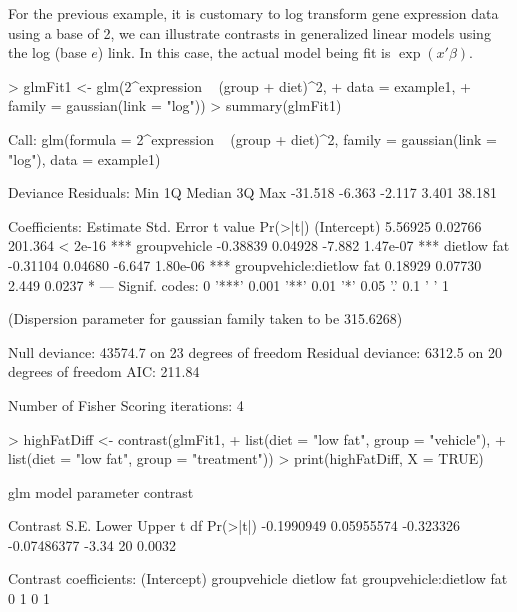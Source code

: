 \documentclass[12pt]{article}
\renewenvironment{Schunk}{\vspace{\topsep}}{\vspace{\topsep}}
\begin{document}
For the previous example, it is customary to log transform gene expression data using a base of 2, we can illustrate contrasts in generalized linear models using the log (base $e$) link. In this case, the actual model being fit is $\exp(x'\beta)$.  
\begin{Schunk}
\begin{Sinput}
> glmFit1 <- glm(2^expression ~ (group + diet)^2, 
+                data = example1, 
+                family = gaussian(link = "log"))
> summary(glmFit1)
\end{Sinput}
\begin{Soutput}
Call:
glm(formula = 2^expression ~ (group + diet)^2, family = gaussian(link = "log"), 
    data = example1)

Deviance Residuals: 
    Min       1Q   Median       3Q      Max  
-31.518   -6.363   -2.117    3.401   38.181  

Coefficients:
                         Estimate Std. Error t value Pr(>|t|)    
(Intercept)               5.56925    0.02766 201.364  < 2e-16 ***
groupvehicle             -0.38839    0.04928  -7.882 1.47e-07 ***
dietlow fat              -0.31104    0.04680  -6.647 1.80e-06 ***
groupvehicle:dietlow fat  0.18929    0.07730   2.449   0.0237 *  
---
Signif. codes:  0 '***' 0.001 '**' 0.01 '*' 0.05 '.' 0.1 ' ' 1 

(Dispersion parameter for gaussian family taken to be 315.6268)

    Null deviance: 43574.7  on 23  degrees of freedom
Residual deviance:  6312.5  on 20  degrees of freedom
AIC: 211.84

Number of Fisher Scoring iterations: 4
\end{Soutput}
\begin{Sinput}
> highFatDiff <- contrast(glmFit1, 
+                         list(diet = "low fat", group = "vehicle"),
+                         list(diet = "low fat", group = "treatment"))
> print(highFatDiff, X = TRUE)
\end{Sinput}
\begin{Soutput}
glm model parameter contrast

   Contrast       S.E.     Lower       Upper     t df Pr(>|t|)
 -0.1990949 0.05955574 -0.323326 -0.07486377 -3.34 20   0.0032

Contrast coefficients:
 (Intercept) groupvehicle dietlow fat groupvehicle:dietlow fat
           0            1           0                        1
\end{Soutput}
\end{Schunk}
\end{document}
